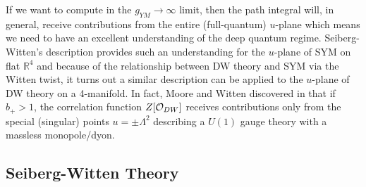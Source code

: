 \documentclass[12pt, onecolumn]{article}
\begin{document}
\vspace{5mm}

\noindent If we want to compute in the $g_{YM} \rightarrow \infty$ limit, then the path integral will, in general, receive contributions from the entire (full-quantum) $u$-plane which means we need to have an excellent understanding of the deep quantum regime.  Seiberg-Witten's description provides such an understanding for the $u$-plane of SYM on flat $\mathbb{R}^{4}$ and because of the relationship between DW theory and SYM via the Witten twist, it turns out a similar description can be applied to the $u$-plane of DW theory on a 4-manifold.  In fact, Moore and Witten discovered in \cite{Moore_Witten} that if $b_{+}>1$, the correlation function $Z[{\cal O}_{DW}]$ receives contributions only from the special (singular) points $u=\pm \Lambda^2$ describing a $U(1)$ gauge theory with a massless monopole/dyon.

\subsection{Seiberg-Witten Theory}
\end{document}
